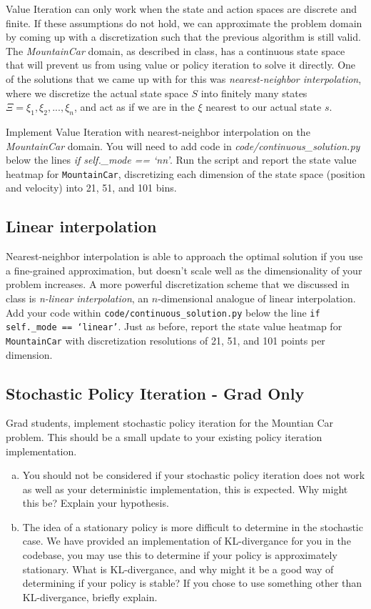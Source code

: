 \documentclass{article}
\begin{document}
Value Iteration can only work when the state and action spaces are discrete and finite. If these assumptions do not hold, we can approximate the problem domain by coming up with a discretization such that the previous algorithm is still valid. The \textit{MountainCar} domain, as described in class, has a continuous state space that will prevent us from using value or policy iteration to solve it directly. One of the solutions that we came up with for this was \emph{nearest-neighbor interpolation}, where we discretize the actual state space $S$ into finitely many states $\Xi={\xi_1, \xi_2,...,\xi_n}$, and act as if we are in the $\xi$ nearest to our actual state $s$.

Implement Value Iteration with nearest-neighbor interpolation on the \textit{MountainCar} domain. You will need to add code in \textit{code/continuous\_solution.py} below the lines \textit{if self.\_mode == `nn'}. Run the script and report the state value heatmap for \texttt{MountainCar}, discretizing each dimension of the state space (position and velocity) into 21, 51, and 101 bins.

\newpage
\subsection{Linear interpolation}
Nearest-neighbor interpolation is able to approach the optimal solution if you use a fine-grained approximation, but doesn't scale well as the dimensionality of your problem increases. A more powerful discretization scheme that we discussed in class is \emph{n-linear interpolation}, an $n$-dimensional analogue of linear interpolation. Add your code within \texttt{code/continuous\_solution.py} below the line \texttt{if self.\_mode == `linear'}. Just as before, report the state value heatmap for \texttt{MountainCar} with discretization resolutions of 21, 51, and 101 points per dimension.



\subsection{Stochastic Policy Iteration - Grad Only}
Grad students, implement stochastic policy iteration for the Mountian Car problem. This should be a small update to your existing policy iteration implementation.

\begin{enumerate}[a)]
    \item You should not be considered if your stochastic policy iteration does not work as well as your deterministic implementation, this is expected. Why might this be? Explain your hypothesis.
    \item The idea of  a stationary policy is more difficult to determine in the stochastic case. We have provided an implementation of KL-divergance for you in the codebase, you may use this to determine if your policy is approximately stationary. What is KL-divergance, and why might it be a good way of determining if your policy is stable? If you chose to use something other than KL-divergance, briefly explain.
\end{enumerate}
\end{document}
